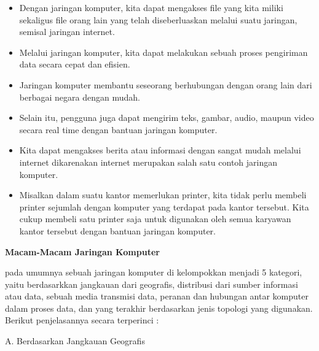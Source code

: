\begin{itemize}
\item Dengan jaringan komputer, kita dapat mengakses file yang kita miliki sekaligus file orang lain yang telah diseberluaskan melalui suatu jaringan, semisal jaringan internet. \par
\noindent 
\item Melalui jaringan komputer, kita dapat melakukan sebuah proses pengiriman data secara cepat dan efisien. \par
\noindent 
\item Jaringan komputer membantu seseorang berhubungan dengan orang lain dari berbagai negara dengan mudah. \par
\noindent 
\item Selain itu, pengguna juga dapat mengirim teks, gambar, audio, maupun video secara real time dengan bantuan jaringan komputer. \par
\noindent 
\item Kita dapat mengakses berita atau informasi dengan sangat mudah melalui internet dikarenakan internet merupakan salah satu contoh jaringan komputer. \par
\noindent 
\item Misalkan dalam suatu kantor memerlukan printer, kita tidak perlu membeli printer sejumlah dengan komputer yang terdapat pada kantor tersebut. Kita cukup membeli satu printer saja untuk digunakan oleh semua karyawan kantor tersebut dengan bantuan jaringan komputer.\end{itemize}
 \par
\vspace{12pt}
\noindent 
\textbf{Macam-Macam Jaringan Komputer} \par
pada umumnya sebuah jaringan komputer di kelompokkan menjadi 5 kategori, yaitu berdasarkkan jangkauan dari geografis, distribusi dari sumber informasi atau data, sebuah media transmisi data, peranan dan hubungan antar komputer dalam proses data, dan yang terakhir berdasarkan jenis topologi yang digunakan. Berikut penjelasannya secara terperinci : \par
\vspace{12pt}
\noindent 
A. Berdasarkan Jangkauan Geografis \par
\vspace{12pt}
\noindent 
